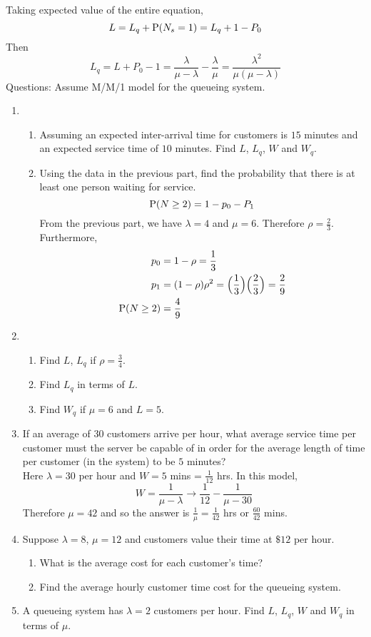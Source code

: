 \documentclass[12pt]{article}
\begin{document}
Taking expected value of the entire equation, 
$$ L = L_q + \mathrm{P}( N_s = 1 ) = L_q + 1 - P_0$$ 
Then $$L_q = L + P_0 - 1 = \frac{\lambda}{\mu - \lambda} - \frac{\lambda}{\mu} = \frac{\lambda^2}{\mu(\mu - \lambda)} $$ 
Questions: Assume M/M/1 model for the queueing system.  \begin{enumerate} 
\item \begin{enumerate} 
\item Assuming an expected inter-arrival time for customers is $15$ minutes and an expected service time of $10$ minutes. Find $L$, $L_q$, $W$ and $W_q$. 
\item Using the data in the previous part, find the probability that there is at least one person waiting for service. $$ \mathrm{P}( N \geq 2 ) = 1 - p_0 - P_1$$ 
From the previous part, we have $\lambda = 4$ and $\mu = 6$. Therefore $\rho = \frac{2}{3}$. Furthermore, $$ \begin{aligned} p_0 &= 1 - \rho = \frac{1}{3} \\ p_1 &= (1-\rho)\rho^2 = \Big(\frac{1}{3}\Big)\Big(\frac{2}{3}\Big) = \frac{2}{9} \\ \mathrm{P}( N \geq 2 ) &= \frac{4}{9} \end{aligned} $$ 
\end{enumerate} 
\item \begin{enumerate} 
\item Find $L$, $L_q$ if $\rho = \frac{3}{4}$. 
\item Find $L_q$ in terms of $L$. 
\item Find $W_q$ if $\mu = 6$ and $L = 5$. 
\end{enumerate} 
\item If an average of $30$ customers arrive per hour, what average service time per customer must the server be capable of in order for the average length of time per customer (in the system) to be $5$ minutes? \\
Here $\lambda = 30$ per hour and $W = 5$ mins = $\frac{1}{12}$ hrs. In this model,
$$W = \frac{1}{\mu - \lambda} \to \frac{1}{12} - \frac{1}{\mu - 30}$$
Therefore $\mu = 42$ and so the answer is $\frac{1}{\mu} = \frac{1}{42}$ hrs or $\frac{60}{42}$ mins. 
\item Suppose $\lambda = 8$, $\mu = 12$ and customers value their time at $\$12$ per hour. \begin{enumerate} 
\item What is the average cost for each customer's time? 
\item Find the average hourly customer time cost for the queueing system. 
\end{enumerate} 
\item A queueing system has $\lambda = 2$ customers per hour. Find $L$, $L_q$, $W$ and $W_q$ in terms of $\mu$. 
\end{enumerate} 
\end{document}
